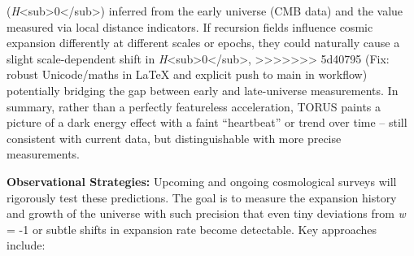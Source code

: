 \documentclass[]{article}
\begin{document}
(\emph{H}\textless{}sub\textgreater{}0\textless{}/sub\textgreater{})
inferred from the early universe (CMB data) and the value measured via
local distance indicators. If recursion fields influence cosmic
expansion differently at different scales or epochs, they could
naturally cause a slight scale-dependent shift in
\emph{H}\textless{}sub\textgreater{}0\textless{}/sub\textgreater{}​,
>>>>>>> 5d40795 (Fix: robust Unicode/maths in LaTeX and explicit push to main in workflow)
potentially bridging the gap between early and late-universe
measurements. In summary, rather than a perfectly featureless
acceleration, TORUS paints a picture of a dark energy effect with a
faint ``heartbeat'' or trend over time -- still consistent with current
data, but distinguishable with more precise measurements.

\textbf{Observational Strategies:} Upcoming and ongoing cosmological
surveys will rigorously test these predictions. The goal is to measure
the expansion history and growth of the universe with such precision
that even tiny deviations from \emph{w} = -1 or subtle shifts in
expansion rate become detectable. Key approaches include:
\end{document}
